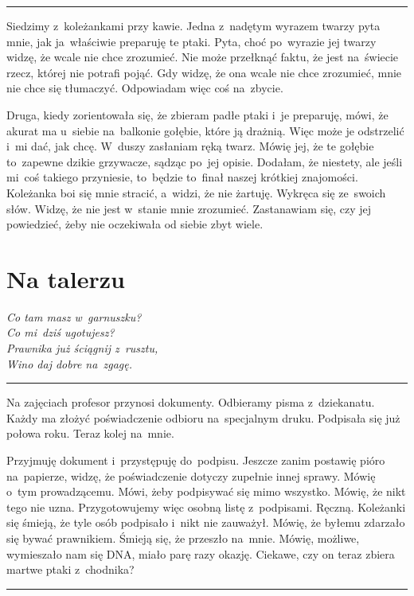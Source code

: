 \documentclass[9pt, a5paper]{memoir}
\begin{document}
\fancybreak{* \quad * \quad *}

Siedzimy z~koleżankami przy kawie. Jedna z~nadętym wyrazem twarzy pyta mnie, jak ja~właściwie preparuję te ptaki. Pyta, choć po~wyrazie jej twarzy widzę, że wcale nie chce zrozumieć. Nie może przełknąć faktu, że jest na~świecie rzecz, której nie potrafi pojąć. Gdy widzę, że ona wcale nie chce zrozumieć, mnie nie chce się tłumaczyć. Odpowiadam więc coś na~zbycie.

Druga, kiedy zorientowała się, że zbieram padłe ptaki i~je preparuję, mówi, że akurat ma u~siebie na~balkonie gołębie, które ją drażnią. Więc może je odstrzelić i~mi dać, jak chcę. W~duszy zasłaniam ręką twarz. Mówię jej, że te gołębie to~zapewne dzikie grzywacze, sądząc po~jej opisie. Dodałam, że niestety, ale jeśli mi~coś takiego przyniesie, to~będzie to~finał naszej krótkiej znajomości. Koleżanka boi się mnie stracić, a~widzi, że nie żartuję. Wykręca się ze~swoich słów. Widzę, że nie jest w~stanie mnie zrozumieć. Zastanawiam się, czy jej powiedzieć, żeby nie oczekiwała od siebie zbyt wiele.

\newpage
\section{Na talerzu}
{
\itshape
Co tam masz w~garnuszku?\\
Co mi~dziś ugotujesz?\\
Prawnika już ściągnij z~rusztu,\\
Wino daj dobre na~zgagę.
}

\fancybreak{* \quad * \quad *}

Na zajęciach profesor przynosi dokumenty. Odbieramy pisma z~dziekanatu. Każdy ma złożyć poświadczenie odbioru na~specjalnym druku. Podpisała się już połowa roku. Teraz kolej na~mnie.

Przyjmuję dokument i~przystępuję do~podpisu. Jeszcze zanim postawię pióro na~papierze, widzę, że poświadczenie dotyczy zupełnie innej sprawy. Mówię o~tym prowadzącemu. Mówi, żeby podpisywać się mimo wszystko. Mówię, że nikt tego nie uzna. Przygotowujemy więc osobną listę z~podpisami. Ręczną. Koleżanki się śmieją, że tyle osób podpisało i~nikt nie zauważył. Mówię, że byłemu zdarzało się bywać prawnikiem. Śmieją się, że przeszło na~mnie. Mówię, możliwe, wymieszało nam się DNA, miało parę razy okazję. Ciekawe, czy on teraz zbiera martwe ptaki z~chodnika?

\fancybreak{* \quad * \quad *}
\end{document}
